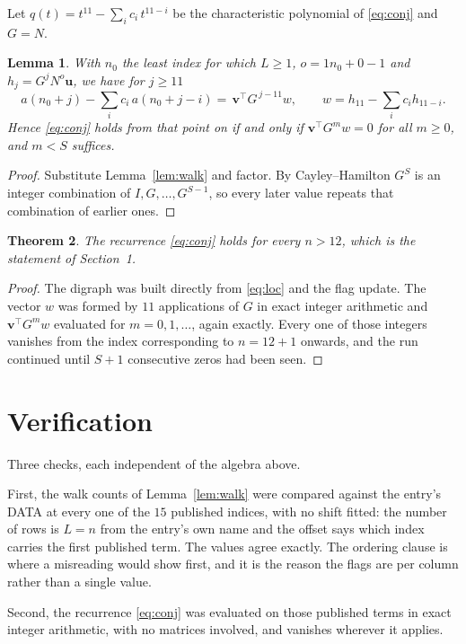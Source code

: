 \documentclass[11pt,a4paper]{article}
\theoremstyle{plain}
\newtheorem{theorem}{Theorem}
\newtheorem{lemma}[theorem]{Lemma}
\theoremstyle{definition}
\begin{document}
Let $q(t)=t^{11}-\sum_i c_i\,t^{11-i}$ be the characteristic polynomial of
\eqref{eq:conj} and $G=N$.

\begin{lemma}\label{lem:crit}
With $n_0$ the least index for which $L\ge1$, $o=1n_0+0-1$ and
$h_j=G^{j}N^{o}\mathbf{u}$, we have for $j\ge11$
\[
a(n_0+j)-\sum_i c_i\,a(n_0+j-i)=\,\mathbf{v}^{\!\top}G^{\,j-11}w,
\qquad w=h_{11}-\sum_i c_ih_{11-i} .
\]
Hence \eqref{eq:conj} holds from that point on if and only if
$\mathbf{v}^{\!\top}G^{m}w=0$ for all $m\ge0$, and $m<S$ suffices.
\end{lemma}

\begin{proof}
Substitute Lemma~\ref{lem:walk} and factor. By Cayley--Hamilton $G^{S}$ is an integer
combination of $I,G,\dots,G^{S-1}$, so every later value repeats that combination of earlier
ones.
\end{proof}

\begin{theorem}
The recurrence \eqref{eq:conj} holds for every $n>12$, which is the statement of
Section~1.
\end{theorem}

\begin{proof}
The digraph was built directly from \eqref{eq:loc} and the flag update. The vector $w$ was
formed by $11$ applications of $G$ in exact integer arithmetic and
$\mathbf{v}^{\!\top}G^{m}w$ evaluated for $m=0,1,\dots$, again exactly. Every one of
those integers vanishes from the index corresponding to $n=12+1$ onwards, and the run
continued until $S+1$ consecutive zeros had been seen.
\end{proof}

\section{Verification}

Three checks, each independent of the algebra above.

First, the walk counts of Lemma~\ref{lem:walk} were compared against the entry's DATA at
every one of the $15$ published indices, with no shift fitted: the number of rows is
$L=n$ from the entry's own name and the offset says which index carries the first
published term. The values agree exactly. The ordering clause is where a misreading would
show first, and it is the reason the flags are per column rather than a single value.

Second, the recurrence \eqref{eq:conj} was evaluated on those published terms in exact
integer arithmetic, with no matrices involved, and vanishes wherever it applies.
\end{document}
